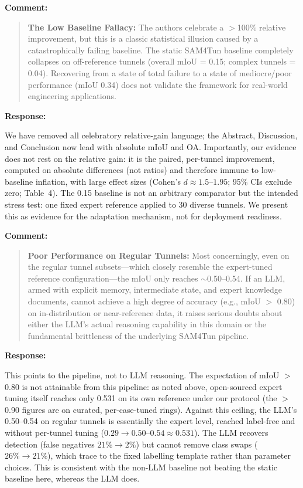 \documentclass[11pt,a4paper]{article}
\newenvironment{commentblock}{%
  \par\smallskip\noindent\textbf{Comment:}\par
  \begin{quote}\itshape\color{black}
}{%
  \end{quote}\smallskip
}
\newenvironment{responseblock}{%
  \par\smallskip\noindent\textbf{Response:}\par
  \begingroup\color{responsegreen}
}{%
  \endgroup\smallskip
}
\begin{document}
\begin{commentblock}
\textbf{The Low Baseline Fallacy:} The authors celebrate a $>$100\% relative improvement, but this is a classic statistical illusion caused by a catastrophically failing baseline. The static SAM4Tun baseline completely collapses on off-reference tunnels (overall mIoU = 0.15; complex tunnels = 0.04). Recovering from a state of total failure to a state of mediocre/poor performance (mIoU 0.34) does not validate the framework for real-world engineering applications.
\end{commentblock}
\begin{responseblock}
We have removed all celebratory relative-gain language; the Abstract, Discussion, and Conclusion now lead with absolute mIoU and OA. Importantly, our evidence does not rest on the relative gain: it is the paired, per-tunnel improvement, computed on absolute differences (not ratios) and therefore immune to low-baseline inflation, with large effect sizes (Cohen's $d \approx 1.5$--$1.95$; 95\% CIs exclude zero; Table~4). The 0.15 baseline is not an arbitrary comparator but the intended stress test: one fixed expert reference applied to 30 diverse tunnels. We present this as evidence for the adaptation mechanism, not for deployment readiness.

\end{responseblock}

\begin{commentblock}
\textbf{Poor Performance on Regular Tunnels:} Most concerningly, even on the regular tunnel subsets---which closely resemble the expert-tuned reference configuration---the mIoU only reaches $\sim$0.50--0.54. If an LLM, armed with explicit memory, intermediate state, and expert knowledge documents, cannot achieve a high degree of accuracy (e.g., mIoU $>$ 0.80) on in-distribution or near-reference data, it raises serious doubts about either the LLM's actual reasoning capability in this domain or the fundamental brittleness of the underlying SAM4Tun pipeline.
\end{commentblock}
\begin{responseblock}
This points to the pipeline, not to LLM reasoning. The expectation of mIoU $>$ 0.80 is not attainable from this pipeline: as noted above, open-sourced expert tuning itself reaches only 0.531 on its own reference under our protocol (the $>$0.90 figures are on curated, per-case-tuned rings). Against this ceiling, the LLM's 0.50--0.54 on regular tunnels is essentially the expert level, reached label-free and without per-tunnel tuning ($0.29 \rightarrow 0.50$--$0.54 \approx 0.531$). The LLM recovers detection (false negatives $21\% \rightarrow 2\%$) but cannot remove class swaps ($26\% \rightarrow 21\%$), which trace to the fixed labelling template rather than parameter choices. This is consistent with the non-LLM baseline not beating the static baseline here, whereas the LLM does.

\end{responseblock}
\end{document}
